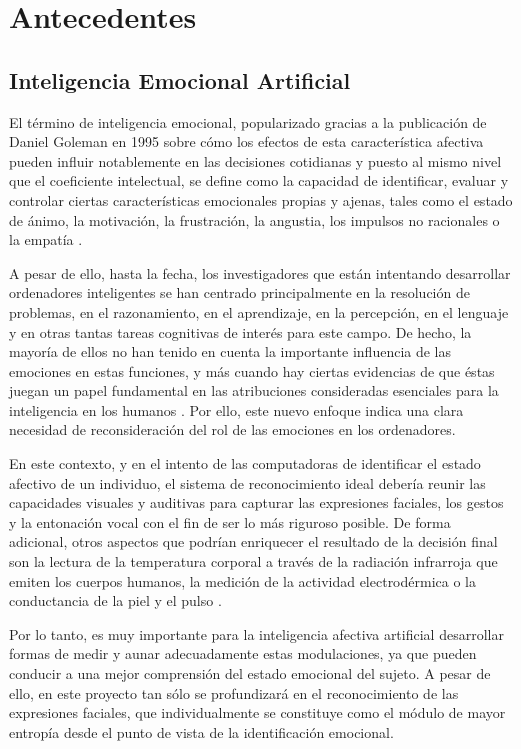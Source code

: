 \chapter{Antecedentes} \label{Chapter:2}

\section{Inteligencia Emocional Artificial}

El término de inteligencia emocional, popularizado gracias a la publicación de Daniel Goleman en 1995 sobre cómo los efectos de esta característica afectiva pueden influir notablemente en las decisiones cotidianas y puesto al mismo nivel que el coeficiente intelectual, se define como la capacidad de identificar, evaluar y controlar ciertas características emocionales propias y ajenas, tales como el estado de ánimo, la motivación, la frustración, la angustia, los impulsos no racionales o la empatía \cite{Goleman}.

A pesar de ello, hasta la fecha, los investigadores que están intentando desarrollar ordenadores inteligentes se han centrado principalmente en la resolución de problemas, en el razonamiento, en el aprendizaje, en la percepción, en el lenguaje y en otras tantas tareas cognitivas de interés para este campo. De hecho, la mayoría de ellos no han tenido en cuenta la importante influencia de las emociones en estas funciones, y más cuando hay ciertas evidencias de que éstas juegan un papel fundamental en las atribuciones consideradas esenciales para la inteligencia en los humanos \cite{EmotionalIntelligence}. Por ello, este nuevo enfoque indica una clara necesidad de reconsideración del rol de las emociones en los ordenadores.

En este contexto, y en el intento de las computadoras de identificar el estado afectivo de un individuo, el sistema de reconocimiento ideal debería reunir las capacidades visuales y auditivas para capturar las expresiones faciales, los gestos y la entonación vocal con el fin de ser lo más riguroso posible. De forma adicional, otros aspectos que podrían enriquecer el resultado de la decisión final son la lectura de la temperatura corporal a través de la radiación infrarroja que emiten los cuerpos humanos, la medición de la actividad electrodérmica o la conductancia de la piel y el pulso \cite{Biosignals}.

Por lo tanto, es muy importante para la inteligencia afectiva artificial desarrollar formas de medir y aunar adecuadamente estas modulaciones, ya que pueden conducir a una mejor comprensión del estado emocional del sujeto. A pesar de ello, en este proyecto tan sólo se profundizará en el reconocimiento de las expresiones faciales, que individualmente se constituye como el módulo de mayor entropía desde el punto de vista de la identificación emocional.

